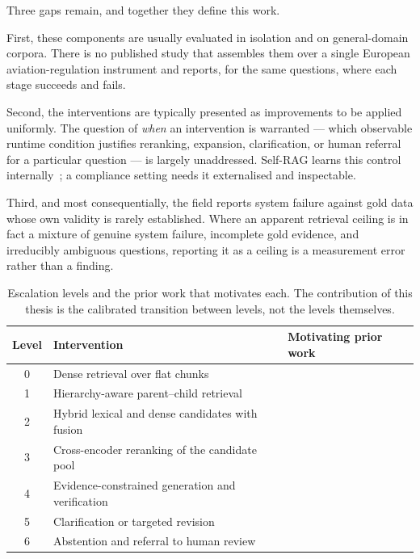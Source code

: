 Three gaps remain, and together they define this work.

First, these components are usually evaluated in isolation and on general-domain corpora. There is no published study that assembles them over a single European aviation-regulation instrument and reports, for the same questions, where each stage succeeds and fails.

Second, the interventions are typically presented as improvements to be applied uniformly. The question of \emph{when} an intervention is warranted --- which observable runtime condition justifies reranking, expansion, clarification, or human referral for a particular question --- is largely unaddressed. Self-RAG learns this control internally~\cite{asai2024selfrag}; a compliance setting needs it externalised and inspectable.

Third, and most consequentially, the field reports system failure against gold data whose own validity is rarely established. Where an apparent retrieval ceiling is in fact a mixture of genuine system failure, incomplete gold evidence, and irreducibly ambiguous questions, reporting it as a ceiling is a measurement error rather than a finding.

\begin{table}[htbp]
  \centering
  \caption{Escalation levels and the prior work that motivates each. The contribution of this thesis is the calibrated transition between levels, not the levels themselves.}
  \label{tab:escalation-literature}
  \small
  \begin{tabularx}{\textwidth}{@{}c l X@{}}
    \toprule
    \textbf{Level} & \textbf{Intervention} & \textbf{Motivating prior work} \\
    \midrule
    0 & Dense retrieval over flat chunks & \cite{lewis2020rag,karpukhin2020dpr} \\
    1 & Hierarchy-aware parent--child retrieval & \cite{chen2024densex,liu2024lostmiddle} \\
    2 & Hybrid lexical and dense candidates with fusion & \cite{robertson2009bm25,cormack2009rrf,bruch2024fusion} \\
    3 & Cross-encoder reranking of the candidate pool & \cite{nogueira2019reranking,nogueira2020monot5,wang2020minilm} \\
    4 & Evidence-constrained generation and verification & \cite{rashkin2023attribution,bohnet2022attributed,gao2023alce} \\
    5 & Clarification or targeted revision & \cite{gao2023rarr} \\
    6 & Abstention and referral to human review & \cite{geifman2017selective,kamath2020selective,magesh2025hallucination} \\
    \bottomrule
  \end{tabularx}
\end{table}

